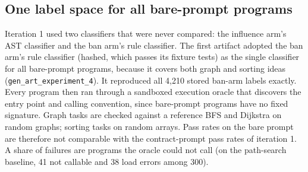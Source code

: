 \documentclass[11pt,letterpaper]{article}
\begin{document}
\subsection{One label space for all bare-prompt programs}
Iteration 1 used two classifiers that were never compared: the influence arm's AST classifier and the ban arm's rule classifier. The first artifact adopted the ban arm's rule classifier (hashed, which passes its fixture tests) as the single classifier for all bare-prompt programs, because it covers both graph and sorting ideas (\texttt{gen\_\allowbreak{}art\_\allowbreak{}experiment\_\allowbreak{}4}). It reproduced all 4,210 stored ban-arm labels exactly. Every program then ran through a sandboxed execution oracle that discovers the entry point and calling convention, since bare-prompt programs have no fixed signature. Graph tasks are checked against a reference BFS and Dijkstra on random graphs; sorting tasks on random arrays. Pass rates on the bare prompt are therefore not comparable with the contract-prompt pass rates of iteration 1. A share of failures are programs the oracle could not call (on the path-search baseline, 41 not callable and 38 load errors among 300).
\end{document}
